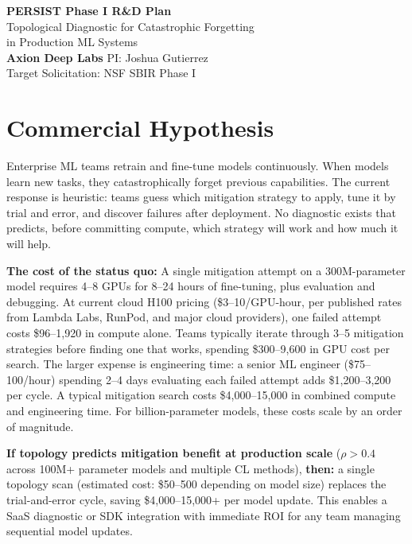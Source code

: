 \documentclass[11pt,letterpaper]{article}
\begin{document}
\begin{center}
{\LARGE\bfseries PERSIST Phase I R\&D Plan}\\[6pt]
{\large Topological Diagnostic for Catastrophic Forgetting\\in Production ML Systems}\\[12pt]
{\normalsize\textbf{Axion Deep Labs} \hspace{1.5em} PI: Joshua Gutierrez}\\[2pt]
{\normalsize Target Solicitation: NSF SBIR Phase I}
\end{center}

\vspace{1em}

\section{Commercial Hypothesis}

Enterprise ML teams retrain and fine-tune models continuously. When models learn new tasks, they catastrophically forget previous capabilities. The current response is heuristic: teams guess which mitigation strategy to apply, tune it by trial and error, and discover failures after deployment. No diagnostic exists that predicts, before committing compute, which strategy will work and how much it will help.

\textbf{The cost of the status quo:} A single mitigation attempt on a 300M-parameter model requires 4--8 GPUs for 8--24 hours of fine-tuning, plus evaluation and debugging. At current cloud H100 pricing (\$3--10/GPU-hour, per published rates from Lambda Labs, RunPod, and major cloud providers), one failed attempt costs \$96--1,920 in compute alone. Teams typically iterate through 3--5 mitigation strategies before finding one that works, spending \$300--9,600 in GPU cost per search. The larger expense is engineering time: a senior ML engineer (\$75--100/hour) spending 2--4 days evaluating each failed attempt adds \$1,200--3,200 per cycle. A typical mitigation search costs \$4,000--15,000 in combined compute and engineering time. For billion-parameter models, these costs scale by an order of magnitude.

\textbf{If topology predicts mitigation benefit at production scale} ($\rho > 0.4$ across 100M+ parameter models and multiple CL methods), \textbf{then:} a single topology scan (estimated cost: \$50--500 depending on model size) replaces the trial-and-error cycle, saving \$4,000--15,000+ per model update. This enables a SaaS diagnostic or SDK integration with immediate ROI for any team managing sequential model updates.
\end{document}
